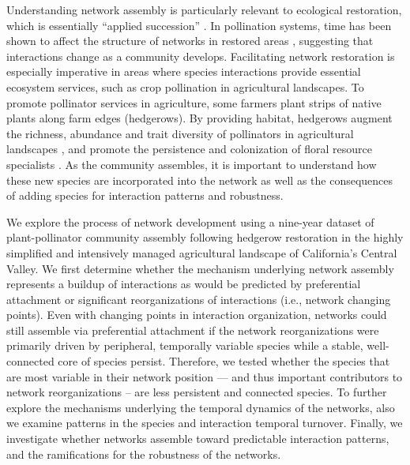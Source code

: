 \documentclass[12pt]{article}
\begin{document}
Understanding network assembly is particularly relevant to ecological
restoration, which is essentially ``applied succession''
\citep[e.g.,][]{parker1997scale}.  In pollination systems, time has
been shown to affect the structure of networks in restored areas
\citep{forup-2008-742, devoto2012understanding}, suggesting that
interactions change as a community develops. Facilitating network
restoration is especially imperative in areas where species
interactions provide essential ecosystem services, such as crop
pollination in agricultural landscapes. To promote pollinator services
in agriculture, some farmers plant strips of native plants along farm
edges (hedgerows).  By providing habitat, hedgerows augment the
richness, abundance and trait diversity of pollinators in agricultural
landscapes \citep{morandin-2013-829, kremen-2015-602,
  ponisio2015farm}, and promote the persistence and colonization of
floral resource specialists \citep{mgonigle-2015-x}. As the community
assembles, it is important to understand how these new species are
incorporated into the network as well as the consequences of adding
species for interaction patterns and robustness.

We explore the process of network development using a nine-year
dataset of plant-pollinator community assembly following hedgerow
restoration in the highly simplified and intensively managed
agricultural landscape of California’s Central Valley. We first
determine whether the mechanism underlying network assembly represents
a buildup of interactions as would be predicted by preferential
attachment or significant reorganizations of interactions (i.e.,
network changing points). Even with changing points in interaction
organization, networks could still assemble via preferential
attachment if the network reorganizations were primarily driven by
peripheral, temporally variable species while a stable, well-connected
core of species persist. Therefore, we tested whether the species that
are most variable in their network position --- and thus important
contributors to network reorganizations -- are less persistent and
connected species. To further explore the mechanisms underlying the
temporal dynamics of the networks, also we examine patterns in the
species and interaction temporal turnover. Finally, we investigate
whether networks assemble toward predictable interaction patterns, and
the ramifications for the robustness of the networks.
\end{document}
